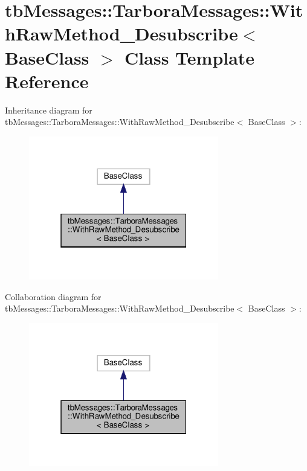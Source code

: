 \hypertarget{classtbMessages_1_1TarboraMessages_1_1WithRawMethod__Desubscribe}{}\section{tb\+Messages\+:\+:Tarbora\+Messages\+:\+:With\+Raw\+Method\+\_\+\+Desubscribe$<$ Base\+Class $>$ Class Template Reference}
\label{classtbMessages_1_1TarboraMessages_1_1WithRawMethod__Desubscribe}


Inheritance diagram for tb\+Messages\+:\+:Tarbora\+Messages\+:\+:With\+Raw\+Method\+\_\+\+Desubscribe$<$ Base\+Class $>$\+:
\nopagebreak
\begin{figure}[H]
\begin{center}
\leavevmode
\includegraphics[width=235pt]{classtbMessages_1_1TarboraMessages_1_1WithRawMethod__Desubscribe__inherit__graph}
\end{center}
\end{figure}


Collaboration diagram for tb\+Messages\+:\+:Tarbora\+Messages\+:\+:With\+Raw\+Method\+\_\+\+Desubscribe$<$ Base\+Class $>$\+:
\nopagebreak
\begin{figure}[H]
\begin{center}
\leavevmode
\includegraphics[width=235pt]{classtbMessages_1_1TarboraMessages_1_1WithRawMethod__Desubscribe__coll__graph}
\end{center}
\end{figure}
